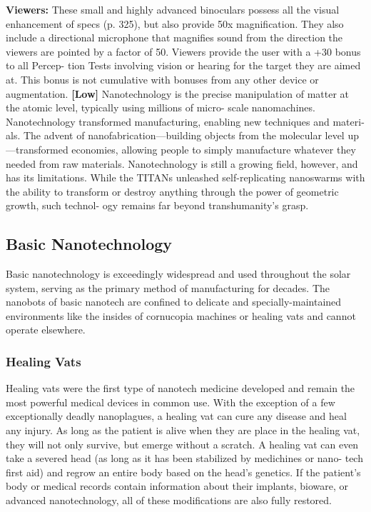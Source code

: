 \textbf{Viewers: }These small and highly advanced binoculars 
possess all the visual enhancement of specs (p. 325), 
but also provide 50x magnification. They also include 
a directional microphone that magnifies sound from 
the direction the viewers are pointed by a factor of 50. 
Viewers provide the user with a +30 bonus to all Percep-
tion Tests involving vision or hearing for the target they 
are aimed at. This bonus is not cumulative with bonuses 
from any other device or augmentation. \textbf{[Low]}
Nanotechnology is the precise manipulation of matter 
at the atomic level, typically using millions of micro-
scale nanomachines. Nanotechnology transformed 
manufacturing, enabling new techniques and materi-
als. The advent of nanofabrication—building objects 
from the molecular level up—transformed economies, 
allowing people to simply manufacture whatever they 
needed from raw materials. Nanotechnology is still a 
growing field, however, and has its limitations. While 
the TITANs unleashed self-replicating nanoswarms 
with the ability to transform or destroy anything 
through the power of geometric growth, such technol-
ogy remains far beyond transhumanity's grasp.

\subsection{Basic Nanotechnology}

Basic nanotechnology is exceedingly widespread 
and used throughout the solar system, serving as the 
primary method of manufacturing for decades. The 
nanobots of basic nanotech are confined to delicate 
and specially-maintained environments like the 
insides of cornucopia machines or healing vats and 
cannot operate elsewhere.

\subsubsection{Healing Vats}

Healing vats were the first type of nanotech medicine 
developed and remain the most powerful medical 
devices in common use. With the exception of a few 
exceptionally deadly nanoplagues, a healing vat can 
cure any disease and heal any injury. As long as the 
patient is alive when they are place in the healing 
vat, they will not only survive, but emerge without a 
scratch. A healing vat can even take a severed head (as 
long as it has been stabilized by medichines or nano-
tech first aid) and regrow an entire body based on the 
head's genetics. If the patient's body or medical records 
contain information about their implants, bioware, or 
advanced nanotechnology, all of these modifications 
are also fully restored.


